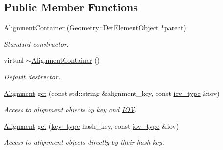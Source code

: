 \subsection*{Public Member Functions}
\begin{DoxyCompactItemize}
\item 
\hyperlink{class_d_d4hep_1_1_alignments_1_1_interna_1_1_alignment_container_a360f49ea724e7c446c8b81adfbac8c85}{AlignmentContainer} (\hyperlink{class_d_d4hep_1_1_geometry_1_1_det_element_object}{Geometry::DetElementObject} $\ast$parent)
\begin{DoxyCompactList}\small\item\em Standard constructor. \item\end{DoxyCompactList}\item 
virtual \hyperlink{class_d_d4hep_1_1_alignments_1_1_interna_1_1_alignment_container_ab3390799871933e6408bbe0c0ff41444}{$\sim$AlignmentContainer} ()
\begin{DoxyCompactList}\small\item\em Default destructor. \item\end{DoxyCompactList}\item 
\hyperlink{class_d_d4hep_1_1_alignments_1_1_alignment}{Alignment} \hyperlink{class_d_d4hep_1_1_alignments_1_1_interna_1_1_alignment_container_a4abe330b3f28a9ee56f512844312f477}{get} (const std::string \&alignment\_\-key, const \hyperlink{class_d_d4hep_1_1_i_o_v}{iov\_\-type} \&iov)
\begin{DoxyCompactList}\small\item\em Access to alignment objects by key and \hyperlink{class_d_d4hep_1_1_i_o_v}{IOV}. \item\end{DoxyCompactList}\item 
\hyperlink{class_d_d4hep_1_1_alignments_1_1_alignment}{Alignment} \hyperlink{class_d_d4hep_1_1_alignments_1_1_interna_1_1_alignment_container_af87ee43a853d77f00ba6ed6902f3b717}{get} (\hyperlink{class_d_d4hep_1_1_alignments_1_1_interna_1_1_alignment_container_a7395f0e25d9e524d2a2bd7df0f4364e6}{key\_\-type} hash\_\-key, const \hyperlink{class_d_d4hep_1_1_i_o_v}{iov\_\-type} \&iov)
\begin{DoxyCompactList}\small\item\em Access to alignment objects directly by their hash key. \item\end{DoxyCompactList}\item 

\end{DoxyCompactItemize}

